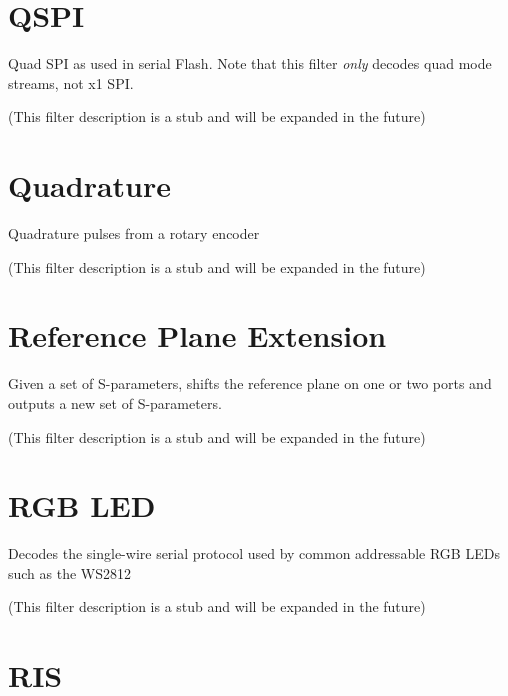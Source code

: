 \pagebreak
\section{QSPI}

Quad SPI as used in serial Flash. Note that this filter \emph{only} decodes quad mode streams, not x1 SPI.

(This filter description is a stub and will be expanded in the future)

\pagebreak
\section{Quadrature}

Quadrature pulses from a rotary encoder

(This filter description is a stub and will be expanded in the future)

\pagebreak
\section{Reference Plane Extension}

Given a set of S-parameters, shifts the reference plane on one or two ports and outputs a new set of S-parameters.

(This filter description is a stub and will be expanded in the future)

\pagebreak
\section{RGB LED}
\label{filter:rgbled}

Decodes the single-wire serial protocol used by common addressable RGB LEDs such as the WS2812

(This filter description is a stub and will be expanded in the future)

\pagebreak
\section{RIS}

